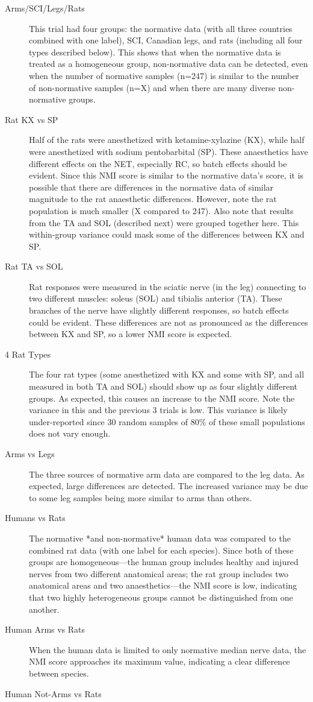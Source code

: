 \documentclass[12pt]{article}
\begin{document}
\begin{description}
\item [Arms/SCI/Legs/Rats] This trial had four groups: the normative data (with all three countries combined with one label), SCI, Canadian legs, and rats (including all four types described below). This shows that when the normative data is treated as a homogeneous group, non-normative data can be detected, even when the number of normative samples (n=247) is similar to the number of non-normative samples (n=X) and when there are many diverse non-normative groups.
\item [Rat KX vs SP] Half of the rats were anesthetized with ketamine-xylazine (KX), while half were anesthetized with sodium pentobarbital (SP). These anaesthetics have different effects on the NET, especially RC, so batch effects should be evident. Since this NMI score is similar to the normative data's score, it is possible that there are differences in the normative data of similar magnitude to the rat anaesthetic differences. However, note the rat population is much smaller (X compared to 247). Also note that results from the TA and SOL (described next) were grouped together here. This within-group variance could mask some of the differences between KX and SP.
\item [Rat TA vs SOL] Rat responses were measured in the sciatic nerve (in the leg) connecting to two different muscles: soleus (SOL) and tibialis anterior (TA). These branches of the nerve have slightly different responses, so batch effects could be evident. These differences are not as pronounced as the differences between KX and SP, so a lower NMI score is expected.
\item [4 Rat Types] The four rat types (some anesthetized with KX and some with SP, and all measured in both TA and SOL) should show up as four slightly different groups. As expected, this causes an increase to the NMI score. Note the variance in this and the previous 3 trials is low. This variance is likely under-reported since 30 random samples of 80\% of these small populations does not vary enough.
\item [Arms vs Legs] The three sources of normative arm data are compared to the leg data. As expected, large differences are detected. The increased variance may be due to some leg samples being more similar to arms than others.
\item [Humans vs Rats] The normative *and non-normative* human data was compared to the combined rat data (with one label for each species). Since both of these groups are homogeneous—the human group includes healthy and injured nerves from two different anatomical areas; the rat group includes two anatomical areas and two anaesthetics—the NMI score is low, indicating that two highly heterogeneous groups cannot be distinguished from one another.
\item [Human Arms vs Rats] When the human data is limited to only normative median nerve data, the NMI score approaches its maximum value, indicating a clear difference between species.
\item [Human Not-Arms vs Rats] %
\end{description}
\end{document}
